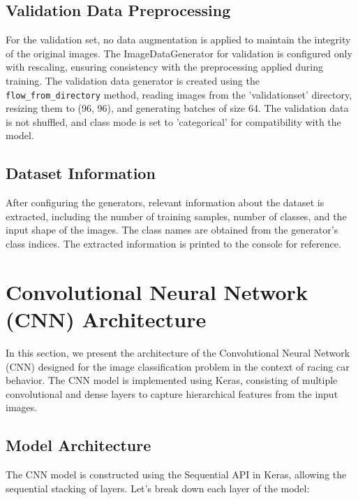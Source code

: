 \documentclass{article}
\begin{document}
\subsection{Validation Data Preprocessing}

For the validation set, no data augmentation is applied to maintain the integrity of the original images. The ImageDataGenerator for validation is configured only with rescaling, ensuring consistency with the preprocessing applied during training.
\newline
\newline
The validation data generator is created using the \texttt{flow\_from\_directory} method, reading images from the 'validationset' directory, resizing them to (96, 96), and generating batches of size 64. The validation data is not shuffled, and class mode is set to 'categorical' for compatibility with the model.

\subsection{Dataset Information}

After configuring the generators, relevant information about the dataset is extracted, including the number of training samples, number of classes, and the input shape of the images. The class names are obtained from the generator's class indices. The extracted information is printed to the console for reference.

\section{Convolutional Neural Network (CNN) Architecture}

In this section, we present the architecture of the Convolutional Neural Network (CNN) designed for the image classification problem in the context of racing car behavior. The CNN model is implemented using Keras, consisting of multiple convolutional and dense layers to capture hierarchical features from the input images.

\subsection{Model Architecture}

The CNN model is constructed using the Sequential API in Keras, allowing the sequential stacking of layers. Let's break down each layer of the model:
\end{document}
